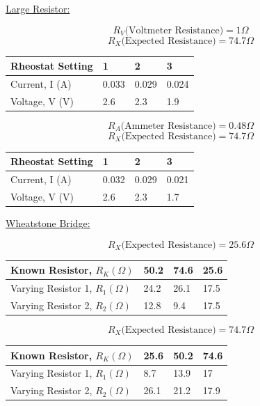\documentclass[11pt, titlepage]{article}
\begin{document}
\underline{Large Resistor:}
\begin{center}
$$R_V \text{(Voltmeter Resistance)}= 1 \Omega$$
$$R_X \text{(Expected Resistance)}= 74.7 \Omega$$
\begin{tabular}
{|m{9em}|m{7em}|m{7em}|m{7em}|}
\hline
Rheostat Setting & 1 & 2 & 3 \\
\hline
Current, I (A) & 0.033 & 0.029 & 0.024 \\
\hline
Voltage, V (V) & 2.6 & 2.3 & 1.9 \\
\hline
\end{tabular}
\end{center}

\begin{center}
$$R_A \text{(Ammeter Resistance)}= 0.48 \Omega$$
$$R_X \text{(Expected Resistance)}= 74.7 \Omega$$
\begin{tabular}
{|m{9em}|m{7em}|m{7em}|m{7em}|}
\hline
Rheostat Setting & 1 & 2 & 3 \\
\hline
Current, I (A) & 0.032 & 0.029 & 0.021 \\
\hline
Voltage, V (V) & 2.6 & 2.3 & 1.7 \\
\hline
\end{tabular}
\end{center}

\underline{Wheatstone Bridge:}
\begin{center}
$$R_X \text{(Expected Resistance)}= 25.6 \Omega$$
\begin{tabular}
{|m{9em}|m{7em}|m{7em}|m{7em}|}
\hline
Known Resistor, $R_K (\Omega)$ & 50.2 & 74.6 & 25.6 \\
\hline
Varying Resistor 1, $R_1 (\Omega)$ & 24.2 & 26.1 & 17.5 \\
\hline
Varying Resistor 2, $R_2 (\Omega)$ & 12.8 & 9.4 & 17.5 \\
\hline
\end{tabular}
\end{center}

\begin{center}
$$R_X \text{(Expected Resistance)}= 74.7 \Omega$$
\begin{tabular}
{|m{9em}|m{7em}|m{7em}|m{7em}|}
\hline
Known Resistor, $R_K (\Omega)$ & 25.6 & 50.2 & 74.6 \\
\hline
Varying Resistor 1, $R_1 (\Omega)$ & 8.7 & 13.9 & 17 \\
\hline
Varying Resistor 2, $R_2 (\Omega)$ & 26.1 & 21.2 & 17.9 \\
\hline
\end{tabular}
\end{center}
\end{document}
